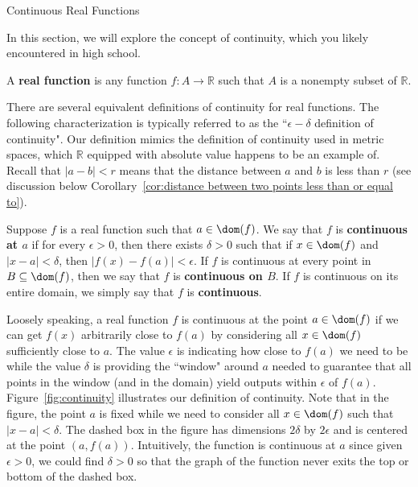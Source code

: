 \begin{section}{Continuous Real Functions}\label{sec:Continuity}

In this section, we will explore the concept of continuity, which you likely encountered in high school.

\begin{definition}
A \textbf{real function} is any function $f:A\to \mathbb{R}$ such that $A$ is a nonempty subset of $\mathbb{R}$. 
\end{definition}

There are several equivalent definitions of continuity for real functions.  The following characterization is typically referred to as the ``$\epsilon-\delta$ definition of continuity". Our definition mimics the definition of continuity used in metric spaces, which $\mathbb{R}$ equipped with absolute value happens to be an example of.  Recall that $|a-b|<r$ means that the distance between $a$ and $b$ is less than $r$ (see discussion below Corollary~\ref{cor:distance between two points less than or equal to}).

\begin{definition}\label{def:continuity}
Suppose $f$ is a real function such that $a\in \dom(f)$. We say that $f$ is \textbf{continuous at $a$} if for every $\epsilon>0$, then there exists $\delta>0$ such that if $x\in\dom(f)$ and $|x-a|<\delta$, then $|f(x)-f(a)|<\epsilon$. If $f$ is continuous at every point in $B\subseteq\dom(f)$, then we say that $f$ is \textbf{continuous on $B$}. If $f$ is continuous on its entire domain, we simply say that $f$ is \textbf{continuous}.
\end{definition}


Loosely speaking, a real function $f$ is continuous at the point $a\in\dom(f)$ if we can get $f(x)$ arbitrarily close to $f(a)$ by considering all $x\in\dom(f)$ sufficiently close to $a$.  The value $\epsilon$ is indicating how close to $f(a)$ we need to be while the value $\delta$ is providing the ``window" around $a$ needed to guarantee that all points in the window (and in the domain) yield outputs within $\epsilon$ of $f(a)$. Figure~\ref{fig:continuity} illustrates our definition of continuity. Note that in the figure, the point $a$ is fixed while we need to consider all $x\in\dom(f)$ such that $|x-a|<\delta$. The dashed box in the figure has dimensions $2\delta$ by $2\epsilon$ and is centered at the point $(a,f(a))$.  Intuitively, the function is continuous at $a$ since given $\epsilon>0$, we could find $\delta >0$ so that the graph of the function never exits the top or bottom of the dashed box.


\end{section}
